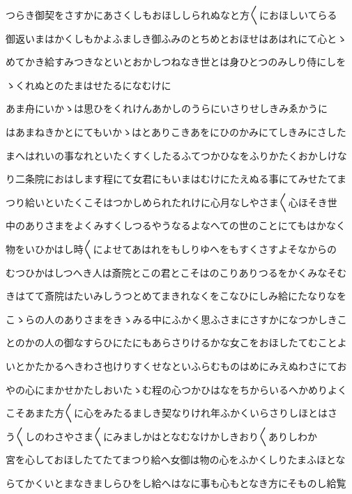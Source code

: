 \documentclass[a4paper,11pt,landscape]{ltjtarticle}
\begin{document}
\par\medskip
つらき御契をさすかにあさくしもおほししられぬなと方〱におほしいてらる
\par\medskip
御返いまはかくしもかよふましき御ふみのとちめとおほせはあはれにて心とゝ
\par\medskip
めてかき給すみつきなといとおかしつねなき世とは身ひとつのみしり侍にしを
\par\medskip
ゝくれぬとのたまはせたるになむけに
\par\medskip
あま舟にいかゝは思ひをくれけんあかしのうらにいさりせしきみゑかうに
\par\medskip
はあまねきかとにてもいかゝはとありこきあをにひのかみにてしきみにさした
\par\medskip
まへはれいの事なれといたくすくしたるふてつかひなをふりかたくおかしけな
\par\medskip
り二条院におはします程にて女君にもいまはむけにたえぬる事にてみせたてま
\par\medskip
つり給いといたくこそはつかしめられたれけに心月なしやさま〱心ほそき世
\par\medskip
中のありさまをよくみすくしつるやうなるよなへての世のことにてもはかなく
\par\medskip
物をいひかはし時〱によせてあはれをもしりゆへをもすくさすよそなからの
\par\medskip
むつひかはしつへき人は斎院とこの君とこそはのこりありつるをかくみなそむ
\par\medskip
きはてて斎院はたいみしうつとめてまきれなくをこなひにしみ給にたなりなを
\par\medskip
こゝらの人のありさまをきゝみる中にふかく思ふさまにさすかになつかしきこ
\par\medskip
とのかの人の御なすらひにたにもあらさりけるかな女こをおほしたてむことよ
\par\medskip
いとかたかるへきわさ也けりすくせなといふらむものはめにみえぬわさにてお
\par\medskip
やの心にまかせかたしおいたゝむ程の心つかひはなをちからいるへかめりよく
\par\medskip
こそあまた方〱に心をみたるましき契なりけれ年ふかくいらさりしほとはさ
\par\medskip
う〱しのわさやさま〱にみましかはとなむなけかしきおり〱ありしわか
\par\medskip
宮を心しておほしたてたてまつり給へ女御は物の心をふかくしりたまふほとな
\par\medskip
らてかくいとまなきましらひをし給へはなに事も心もとなき方にそものし給覧
\par\medskip
\end{document}
